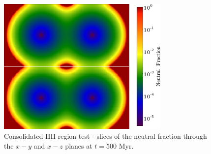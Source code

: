 \begin{figure}[t]
\centerline{\hfill
  \includegraphics[width=0.75\textwidth]{consolidated.pdf}
  \hfill}
  \caption{Consolidated HII region test - slices of the neutral fraction through the $x-y$ and $x-z$ planes at $t=500$ Myr.}
  \label{fig:consolidated}
\end{figure}

